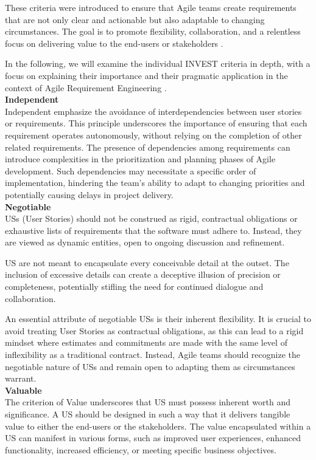 These criteria were introduced to ensure that Agile teams create requirements that are not only clear and actionable but also adaptable to changing circumstances. The goal is to promote flexibility, collaboration, and a relentless focus on delivering value to the end-users or stakeholders \cite{buglione2013improving}.

In the following, we will examine the individual INVEST criteria in depth, with a focus on explaining their importance and their pragmatic application in the context of Agile Requirement Engineering \cite{cohn2004user}. \\ 
\textbf{Independent} \\ 
Independent emphasize the avoidance of interdependencies between user stories or requirements. This principle underscores the importance of ensuring that each requirement operates autonomously, without relying on the completion of other related requirements. The presence of dependencies among requirements can introduce complexities in the prioritization and planning phases of Agile development. Such dependencies may necessitate a specific order of implementation, hindering the team's ability to adapt to changing priorities and potentially causing delays in project delivery. \\ 
\textbf{Negotiable}\\ 
 USs (User Stories) should not be construed as rigid, contractual obligations or exhaustive lists of requirements that the software must adhere to. Instead, they are viewed as dynamic entities, open to ongoing discussion and refinement.

US are not meant to encapsulate every conceivable detail at the outset. The inclusion of excessive details can create a deceptive illusion of precision or completeness, potentially stifling the need for continued dialogue and collaboration. 

An essential attribute of negotiable USs is their inherent flexibility. It is crucial to avoid treating User Stories as contractual obligations, as this can lead to a rigid mindset where estimates and commitments are made with the same level of inflexibility as a traditional contract. Instead, Agile teams should recognize the negotiable nature of USs and remain open to adapting them as circumstances warrant. \\ 
\textbf{Valuable}\\ 
The criterion of Value underscores that US must possess inherent worth and significance. A US should be designed in such a way that it delivers tangible value to either the end-users or the stakeholders. The value encapsulated within a US can manifest in various forms, such as improved user experiences, enhanced functionality, increased efficiency, or meeting specific business objectives.

